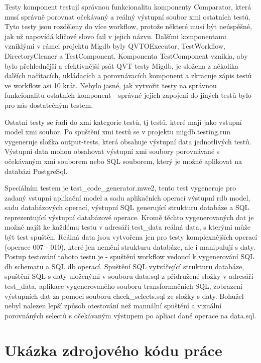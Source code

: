 \documentclass[11pt,twoside,a4paper]{book}
\begin{document}
Testy komponent testují správnou funkcionalitu komponenty Comparator, která
musí správně porovnat očekávaný a reálný výstupní soubor xmi ostatních testů.
Tyto testy jsou rozděleny do více workflow, protože některé musí být neúspěšné,
jak už napovídá klíčové slovo fail v jejich názvu. Dalšími komponentami
vzniklými v rámci projektu Migdb byly QVTOExecutor, TestWorkflow,
DirectoryCleaner a TestComponent. Komponenta TestComponent vznikla, aby bylo
přehlednější a efektivnější psát QVT testy Migdb, je složena z několika dalších
načítacích, ukládacích a porovnávacích komponent a zkracuje zápis testů ve
workflow asi 10 krát. Nebylo jasné, jak vytvořit testy na správnou funkcionalitu
ostatních komponent - správné jejich zapojení do jiných testů bylo pro nás
dostatečným testem.

Ostatní testy se řadí do xmi kategorie testů, tj testů, které mají jako
vstupní model xmi soubor. Po spuštění xmi testů se v projektu
migdb.testing.run vygeneruje složka output-tests, která obsahuje výstupní data 
jednotlivých testů. Výstupní data mohou obsahovat výstupní xmi soubory
porovnávané s očekávaným xmi souborem nebo SQL souborem, který je možné
aplikovat na databázi PostgreSql.

Speciálním testem je test\_code\_generator.mwe2, tento test vygeneruje pro
zadaný vstupní aplikační model a sadu aplikačních operací výstupní rdb model, sadu
databázových operací, výstupní SQL generující strukturu databáze a SQL
reprezentující výstupní databázové operace. Kromě těchto vygenerovaných dat je
možné najít ke každému testu v adresáři test\_data reálná data, s kterými může
být test spuštěn. Reálná data jsou vytvořena jen pro testy komplexnějších
operací (operace 007 - 010), které jen nemění strukturu databáze, ale i
manipulují s daty. Postup testování tohoto testu je - spuštění workflow vedoucí k
vygenerování SQL db schematu a SQL db operací. Spuštění SQL vytvářející
strukturu databáze, spuštění SQL s daty uloženými v souboru data.sql z
přidružené složky v adresáři test\_data, aplikace vygenerovaného souboru
transformačních SQL, zobrazení výstupních dat za pomoci souboru
check\_selects.sql ze složky s daty. Bohužel nebyl nalezen lepší způsob
otestování než manuální spuštění a vizuální porovnáných selectů s očekávaným
výstupem po apliaci dané operace na data.sql.

\chapter{Ukázka zdrojového kódu práce}\label{chapt:ukazka_kodu}
\end{document}

